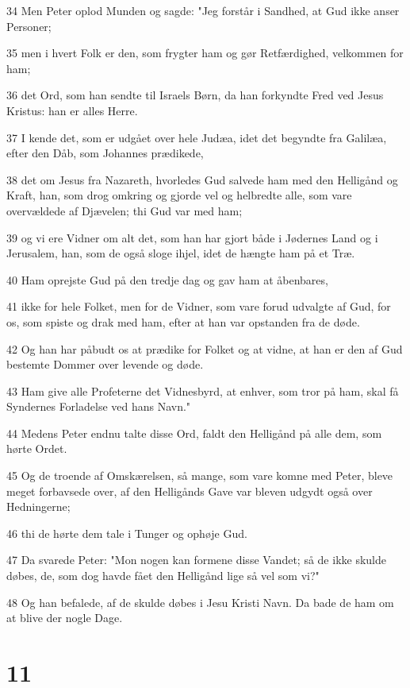 \par 34 Men Peter oplod Munden og sagde: "Jeg forstår i Sandhed, at Gud ikke anser Personer;
\par 35 men i hvert Folk er den, som frygter ham og gør Retfærdighed, velkommen for ham;
\par 36 det Ord, som han sendte til Israels Børn, da han forkyndte Fred ved Jesus Kristus: han er alles Herre.
\par 37 I kende det, som er udgået over hele Judæa, idet det begyndte fra Galilæa, efter den Dåb, som Johannes prædikede,
\par 38 det om Jesus fra Nazareth, hvorledes Gud salvede ham med den Helligånd og Kraft, han, som drog omkring og gjorde vel og helbredte alle, som vare overvældede af Djævelen; thi Gud var med ham;
\par 39 og vi ere Vidner om alt det, som han har gjort både i Jødernes Land og i Jerusalem, han, som de også sloge ihjel, idet de hængte ham på et Træ.
\par 40 Ham oprejste Gud på den tredje dag og gav ham at åbenbares,
\par 41 ikke for hele Folket, men for de Vidner, som vare forud udvalgte af Gud, for os, som spiste og drak med ham, efter at han var opstanden fra de døde.
\par 42 Og han har påbudt os at prædike for Folket og at vidne, at han er den af Gud bestemte Dommer over levende og døde.
\par 43 Ham give alle Profeterne det Vidnesbyrd, at enhver, som tror på ham, skal få Syndernes Forladelse ved hans Navn."
\par 44 Medens Peter endnu talte disse Ord, faldt den Helligånd på alle dem, som hørte Ordet.
\par 45 Og de troende af Omskærelsen, så mange, som vare komne med Peter, bleve meget forbavsede over, af den Helligånds Gave var bleven udgydt også over Hedningerne;
\par 46 thi de hørte dem tale i Tunger og ophøje Gud.
\par 47 Da svarede Peter: "Mon nogen kan formene disse Vandet; så de ikke skulde døbes, de, som dog havde fået den Helligånd lige så vel som vi?"
\par 48 Og han befalede, af de skulde døbes i Jesu Kristi Navn. Da bade de ham om at blive der nogle Dage.

\chapter{11}

